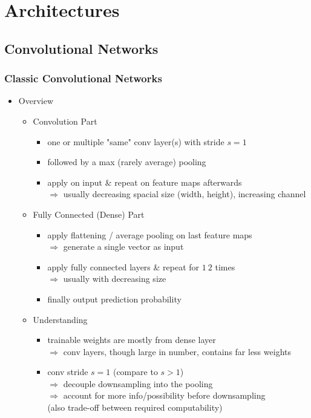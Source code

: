 \section{Architectures}

\subsection{Convolutional Networks}
\subsubsection{Classic Convolutional Networks}
\begin{itemize}
\item Overview
	\begin{itemize}
	\item Convolution Part
		\begin{itemize}
		\item one or multiple "same" conv layer(s) with stride $s=1$
		\item followed by a max (rarely average) pooling
		\item apply on input \& repeat on feature maps afterwards \\
		$\Rightarrow$ usually decreasing spacial size (width, height), increasing channel
		\end{itemize}
	\item Fully Connected (Dense) Part
		\begin{itemize}
		\item apply flattening / average pooling on last feature maps \\
		$\Rightarrow$ generate a single vector as input
		\item apply fully connected layers \& repeat for $1~2$ times \\
		$\Rightarrow$ usually with decreasing size
		\item finally output prediction probability
		\end{itemize}
	\item Understanding
		\begin{itemize}
		\item trainable weights are mostly from dense layer \\
		$\Rightarrow$ conv layers, though large in number, contains far less weights
		\item conv stride $s=1$ (compare to $s>1$) \\
		$\Rightarrow$ decouple downsampling into the pooling \\
		$\Rightarrow$ account for more info/possibility before downsampling \\
		(also trade-off between required computability)
		\end{itemize}
	\end{itemize}


\end{itemize}
